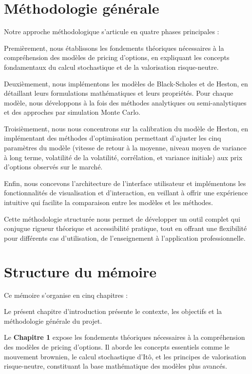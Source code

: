 \section*{Méthodologie générale}

Notre approche méthodologique s'articule en quatre phases principales :

Premièrement, nous établissons les fondements théoriques nécessaires à la compréhension des modèles de pricing d'options, en expliquant les concepts fondamentaux du calcul stochastique et de la valorisation risque-neutre.

Deuxièmement, nous implémentons les modèles de Black-Scholes et de Heston, en détaillant leurs formulations mathématiques et leurs propriétés. Pour chaque modèle, nous développons à la fois des méthodes analytiques ou semi-analytiques et des approches par simulation Monte Carlo.

Troisièmement, nous nous concentrons sur la calibration du modèle de Heston, en implémentant des méthodes d'optimisation permettant d'ajuster les cinq paramètres du modèle (vitesse de retour à la moyenne, niveau moyen de variance à long terme, volatilité de la volatilité, corrélation, et variance initiale) aux prix d'options observés sur le marché.

Enfin, nous concevons l'architecture de l'interface utilisateur et implémentons les fonctionnalités de visualisation et d'interaction, en veillant à offrir une expérience intuitive qui facilite la comparaison entre les modèles et les méthodes.

Cette méthodologie structurée nous permet de développer un outil complet qui conjugue rigueur théorique et accessibilité pratique, tout en offrant une flexibilité pour différents cas d'utilisation, de l'enseignement à l'application professionnelle.

\section*{Structure du mémoire}

Ce mémoire s'organise en cinq chapitres :

Le présent chapitre d'introduction présente le contexte, les objectifs et la méthodologie générale du projet.

Le \textbf{Chapitre 1} expose les fondements théoriques nécessaires à la compréhension des modèles de pricing d'options. Il aborde les concepts essentiels comme le mouvement brownien, le calcul stochastique d'Itô, et les principes de valorisation risque-neutre, constituant la base mathématique des modèles plus avancés.

